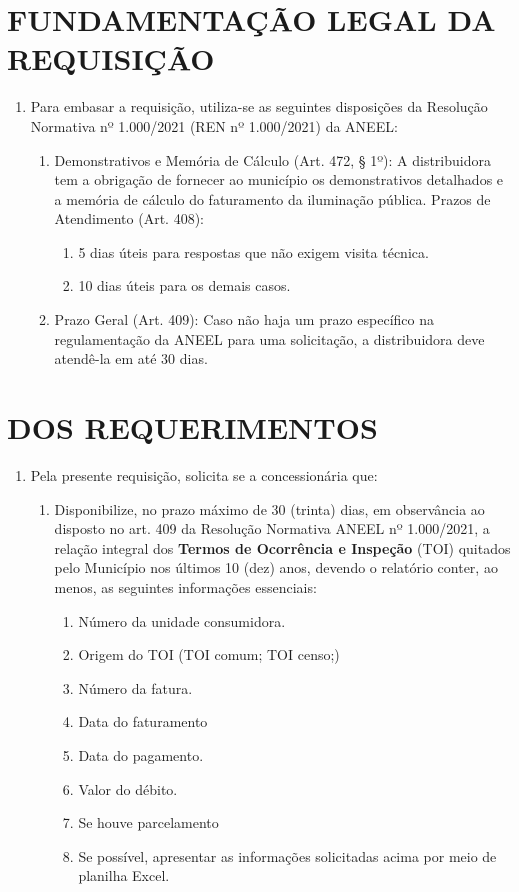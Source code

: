 \newcommand{\tipoRequerimento}{Solicitação de Relatório de TOI's pagos}

\section{FUNDAMENTAÇÃO LEGAL DA REQUISIÇÃO}

\begin{enumerate}[resume]
\item
  Para embasar a requisição, utiliza-se as seguintes disposições da Resolução Normativa nº 1.000/2021 (REN nº 1.000/2021) da ANEEL:
  \begin{enumerate}
  \item
    Demonstrativos e Memória de Cálculo (Art. 472, § 1º): A distribuidora tem a obrigação de fornecer ao município os demonstrativos detalhados e a memória de cálculo do faturamento da iluminação pública. Prazos de Atendimento (Art. 408):
    \begin{enumerate}
      \item  
      5 dias úteis para respostas que não exigem visita técnica.
      \item 
      10 dias úteis para os demais casos.
    \end{enumerate}
  \item 
  Prazo Geral (Art. 409): Caso não haja um prazo específico na regulamentação da ANEEL para uma solicitação, a distribuidora deve atendê-la em até 30 dias.
  \end{enumerate}
\end{enumerate}

\section{DOS REQUERIMENTOS}

\begin{enumerate}[resume]
\item Pela presente requisição, solicita se a concessionária que:
\begin{enumerate}
  \item Disponibilize, no prazo máximo de 30 (trinta) dias, em observância ao disposto no art. 409 da Resolução Normativa ANEEL nº 1.000/2021, a relação integral dos \textbf{Termos de Ocorrência e Inspeção} (TOI) quitados pelo Município nos últimos 10 (dez) anos, devendo o relatório conter, ao menos, as seguintes informações essenciais:
  \begin{enumerate}
    \item Número da unidade consumidora.
    \item Origem do TOI (TOI comum; TOI censo;)
    \item Número da fatura.
    \item Data do faturamento
    \item Data do pagamento.
    \item Valor do débito.
    \item Se houve parcelamento 
    \item Se possível, apresentar as informações solicitadas acima por meio de planilha Excel.
  \end{enumerate}
  \end{enumerate}
\end{enumerate}
